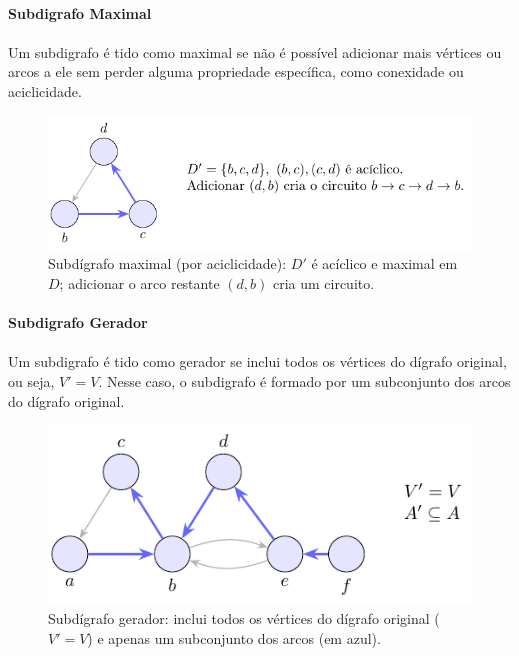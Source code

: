 \documentclass[12pt,a4paper]{article}
\begin{document}
\paragraph{Subdigrafo Maximal}
\paragraph{}
Um subdigrafo é tido como maximal se não é possível adicionar mais vértices ou arcos a ele sem perder alguma propriedade específica, como conexidade ou aciclicidade.


\begin{figure}[H]
    \centering
    \includegraphics[width=0.9\linewidth]{figures/fig_subdigrafo_maximal.pdf}

    \caption{Subdígrafo maximal (por aciclicidade): $D'$ é acíclico e maximal em $D$; adicionar o arco restante $(d,b)$ cria um circuito.}
    \label{fig:subdigrafo-maximal}\end{figure}


\paragraph{Subdigrafo Gerador}
\paragraph{}
Um subdigrafo é tido como gerador se inclui todos os vértices do dígrafo original, ou seja, \(V' = V\). Nesse caso, o subdigrafo é formado por um subconjunto dos arcos do dígrafo original.


\begin{figure}[H]
    \centering
    \includegraphics[width=0.9\linewidth]{figures/fig_subdigrafo_gerador.pdf}

    \caption{Subdígrafo gerador: inclui todos os vértices do dígrafo original ($V'=V$) e apenas um subconjunto dos arcos (em azul).}
    \label{fig:subdigrafo-gerador}\end{figure}
\end{document}
